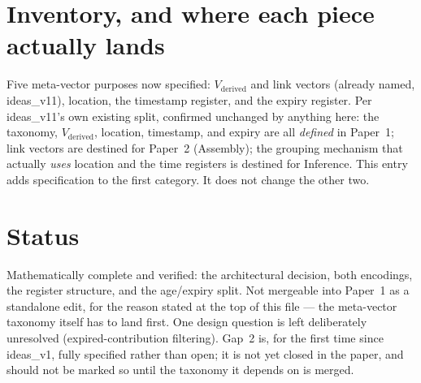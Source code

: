 \documentclass[11pt]{article}
\begin{document}
\section{Inventory, and where each piece actually lands}

Five meta-vector purposes now specified: $V_{\text{derived}}$ and
link vectors (already named, ideas\_v11), location, the timestamp
register, and the expiry register. Per ideas\_v11's own existing
split, confirmed unchanged by anything here: the taxonomy,
$V_{\text{derived}}$, location, timestamp, and expiry are all
\emph{defined} in Paper~1; link vectors are destined for Paper~2
(Assembly); the grouping mechanism that actually \emph{uses}
location and the time registers is destined for Inference. This
entry adds specification to the first category. It does not change
the other two.

\section{Status}

Mathematically complete and verified: the architectural decision,
both encodings, the register structure, and the age/expiry split.
Not mergeable into Paper~1 as a standalone edit, for the reason
stated at the top of this file --- the meta-vector taxonomy itself
has to land first. One design question is left deliberately
unresolved (expired-contribution filtering). Gap~2 is, for the first
time since ideas\_v1, fully specified rather than open; it is not
yet closed in the paper, and should not be marked so until the
taxonomy it depends on is merged.
\end{document}

